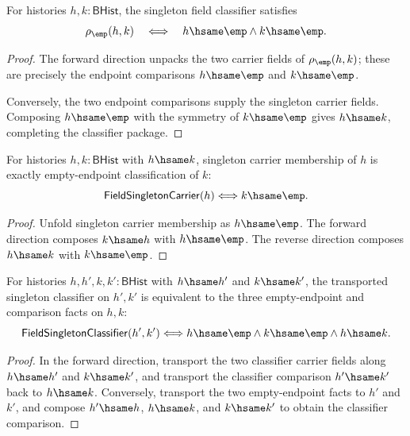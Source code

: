 \begin{theorem}
\label{thm:field-singleton-classifier-empty-endpoints}
For histories $h,k:\mathsf{BHist}$, the singleton field classifier satisfies
$$
\rho_{\emp}(h,k)
\quad\Longleftrightarrow\quad
h\hsame\emp\land k\hsame\emp.
$$
\end{theorem}
\begin{proof}
The forward direction unpacks the two carrier fields of
$\rho_{\emp}(h,k)$; these are precisely the endpoint comparisons
$h\hsame\emp$ and $k\hsame\emp$.

Conversely, the two endpoint comparisons supply the singleton carrier fields.
Composing $h\hsame\emp$ with the symmetry of $k\hsame\emp$ gives
$h\hsame k$, completing the classifier package.
\end{proof}

\begin{theorem}
\label{thm:field-singleton-carrier-hsame-empty-transport}
For histories $h,k:\mathsf{BHist}$ with $h\hsame k$, singleton carrier
membership of $h$ is exactly empty-endpoint classification of $k$:
$$
\mathsf{FieldSingletonCarrier}(h)\Longleftrightarrow k\hsame\emp.
$$
\end{theorem}
\begin{proof}
Unfold singleton carrier membership as $h\hsame\emp$. The forward direction
composes $k\hsame h$ with $h\hsame\emp$. The reverse direction composes
$h\hsame k$ with $k\hsame\emp$.
\end{proof}

\begin{theorem}
\label{thm:field-singleton-classifier-hsame-empty-transport}
For histories $h,h',k,k':\mathsf{BHist}$ with $h\hsame h'$ and $k\hsame k'$,
the transported singleton classifier on $h',k'$ is equivalent to the three
empty-endpoint and comparison facts on $h,k$:
$$
\mathsf{FieldSingletonClassifier}(h',k')
\Longleftrightarrow
h\hsame\emp\land k\hsame\emp\land h\hsame k.
$$
\end{theorem}
\begin{proof}
In the forward direction, transport the two classifier carrier fields along
$h\hsame h'$ and $k\hsame k'$, and transport the classifier comparison
$h'\hsame k'$ back to $h\hsame k$. Conversely, transport the two empty-endpoint
facts to $h'$ and $k'$, and compose $h'\hsame h$, $h\hsame k$, and
$k\hsame k'$ to obtain the classifier comparison.
\end{proof}

